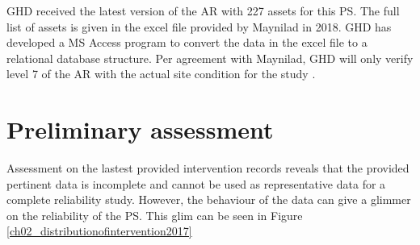 GHD received the latest version of the AR with 227 assets for this PS. The full list of assets is given in the excel file provided by Maynilad in 2018. GHD has developed a MS Access program to convert the data in the excel file to a relational database structure. Per agreement with Maynilad, GHD will only verify level 7 of the AR with the actual site condition for the study \cite{GHD2018m}. 
\section{Preliminary assessment}
\label{22}
Assessment on the lastest provided intervention records reveals that the provided pertinent data is incomplete and cannot be used as representative data for a complete reliability study. However, the behaviour of the data can give a glimmer on the reliability of the PS. This glim can be seen in Figure  \ref{ch02_distributionofintervention2017} 

